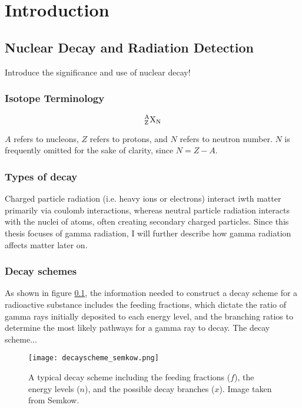 \documentclass[12pt,twoside]{reedthesis}
\begin{document}
  \mainmatter %
  \pagestyle{fancyplain} %

    \chapter*{Introduction}

    \section{Nuclear Decay and Radiation Detection}
Introduce the significance and use of nuclear decay!
\subsection{Isotope Terminology}
     \begin{equation}
     \centering
     \mathrm{^{A}_{Z}X_{N}}
     \end{equation}
     
    $A$ refers to nucleons, $Z$ refers to protons, and $N$ refers to neutron number. $N$ is frequently omitted for the sake of clarity, since $N = Z - A$.
\subsection{Types of decay}
  Charged particle radiation (i.e. heavy ions or electrons) interact iwth matter primarily via coulomb interactions, whereas neutral particle radiation interacts with the nuclei of atoms, often creating secondary charged particles. \cite{Knoll} Since this thesis focuses of gamma radiation, I will further describe how gamma radiation affects matter later on.
  	
\subsection{Decay schemes}
 As shown in figure \ref{decay}, the information needed to construct a decay scheme for a radioactive substance includes the feeding fractions, which dictate the ratio of gamma rays initially deposited to each energy level, and the branching ratios to determine the most likely pathways for a gamma ray to decay. The decay scheme...
    	\begin{figure}[h!]
	       \centering
	    \texttt{[image: decayscheme\_semkow.png]}
	     \caption{A typical decay scheme including the feeding fractions ($f$), the energy levels ($n$), and the possible decay branches ($x$). Image taken from Semkow.}
	 \label{decay}
	\end{figure}
\end{document}
